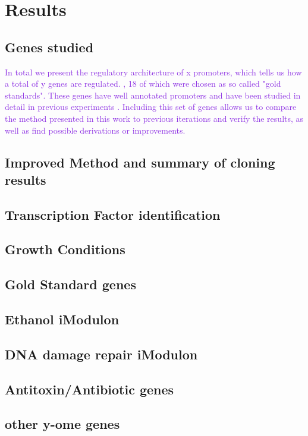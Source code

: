 \section{Results}
\subsection{Genes studied}
\textcolor{BlueViolet}{In total we present the regulatory architecture of x promoters, which tells us how a total of y genes are regulated. , 18 of which were chosen as so called "gold standards". These genes have well annotated promoters and have been studied in detail in previous experiments \cite{belliveau2018systematic,ireland2020deciphering}. Including this set of genes allows us to compare the method presented in this work to previous iterations and verify the results, as well as find possible derivations or improvements.}
\subsection{Improved Method and summary of cloning results}
\subsection{Transcription Factor identification}
\subsection{Growth Conditions}
\subsection{Gold Standard genes}
\subsection{Ethanol iModulon}
\subsection{DNA damage repair iModulon}
\subsection{Antitoxin/Antibiotic genes}
\subsection{other y-ome genes}
